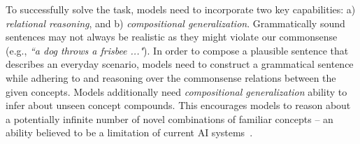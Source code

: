 \documentclass[11pt,a4paper]{article}
\begin{document}
To successfully solve the task, models need to incorporate two key capabilities: a) \textit{relational reasoning}, and b) \textit{compositional generalization}. 
Grammatically sound sentences may not always be realistic as they might violate our commonsense (e.g., \textit{``a dog throws a frisbee ..."}). In order to compose a plausible sentence that describes an everyday scenario, models need to construct a grammatical sentence while adhering to and reasoning over the commonsense relations between the given concepts.
Models additionally need \textit{compositional generalization} ability to infer about unseen concept compounds. This encourages models to reason about a potentially infinite number of novel combinations of familiar concepts -- an ability believed to be a limitation of current AI systems~\cite{lake2018generalization, keysers2020measuring}.
\end{document}
